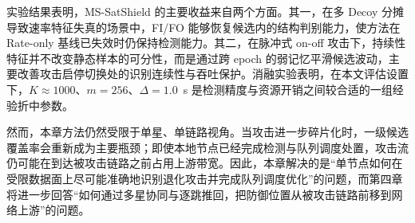实验结果表明，MS-SatShield 的主要收益来自两个方面。其一，在多 Decoy 分摊导致速率特征失真的场景中，FI/FO 能够恢复候选内的结构判别能力，使方法在 Rate-only 基线已失效时仍保持检测能力。其二，在脉冲式 on-off 攻击下，持续性特征并不改变静态样本的可分性，而是通过跨 epoch 的弱记忆平滑候选波动，主要改善攻击启停切换处的识别连续性与吞吐保护。消融实验表明，在本文评估设置下，$K\approx1000$、$m=256$、$\Delta=1.0$~s 是检测精度与资源开销之间较合适的一组经验折中参数。

然而，本章方法仍然受限于单星、单链路视角。当攻击进一步碎片化时，一级候选覆盖率会重新成为主要瓶颈；即使本地节点已经完成检测与队列调度处置，攻击流仍可能在到达被攻击链路之前占用上游带宽。因此，本章解决的是“单节点如何在受限数据面上尽可能准确地识别退化攻击并完成队列调度优化”的问题，而第四章将进一步回答“如何通过多星协同与逐跳推回，把防御位置从被攻击链路前移到网络上游”的问题。



